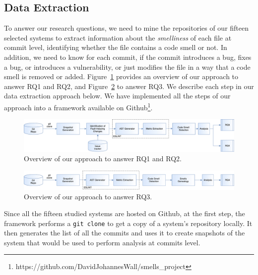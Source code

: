 \subsection{Data Extraction}\label{extraction}
To answer our research questions, we need to mine the repositories of our {\color{blue}fifteen} selected systems to extract information about the \emph{smelliness} of each file at commit level, identifying whether the file contains a code smell or not. In addition, we need to know for each commit, if the commit introduces a bug, fixes a bug{\color{blue}, or introduces a vulnerability,} or just modifies the file in a way that a code smell is removed or added. Figure~\ref{process} provides an overview of our approach {\color{blue}to answer RQ1 and RQ2, and Figure~\ref{process3} to answer RQ3}. We describe each step in our data extraction approach below. We have implemented all the steps of our approach into a framework available on Github\footnote{https://github.com/DavidJohannesWall/smells\_project}.

\begin{figure}[t]
\captionsetup{font=small}
\centering%
	\includegraphics[scale=0.45]{pdfs/total.pdf}
	\caption{Overview of our approach to answer RQ1 and RQ2.}
\label{process}
\vspace{-15pt}
\end{figure}

\begin{figure}[t]
	\captionsetup{font=small}
	\centering%
	\includegraphics[scale=0.45]{pdfs/total3.pdf}
	\caption{Overview of our approach to answer RQ3.}
	\label{process3}
	\vspace{-15pt}
\end{figure}

 Since all the fifteen studied systems are hosted on Github, at the first step, the framework performs a \texttt{git clone} to get a copy of a system's repository locally. It then generates the list of all the commits and uses it to create snapshots of the system that would be used to perform analysis at commits level.


